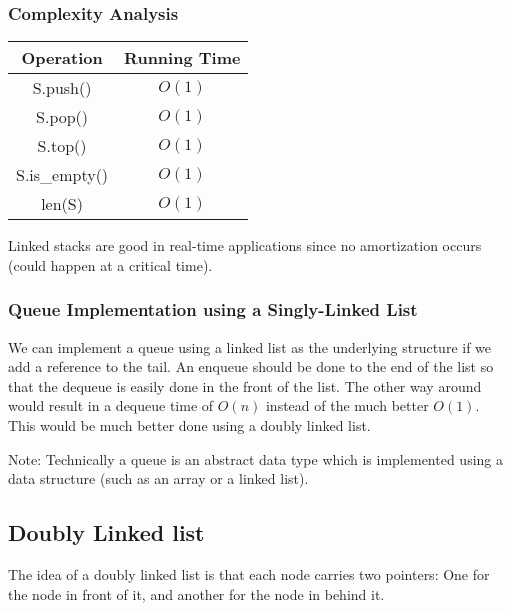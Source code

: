 \documentclass[]{article}
\begin{document}
\subsubsection{Complexity Analysis}\bigbreak

\begin{center}
	\begin{table}[h!]\centering
		\begin{tabular}{|c|c|}
			\hline
			Operation   & Running Time\\\hline
			S.push() & $O(1)$\\
			S.pop() & $O(1)$\\
			S.top() & $O(1)$\\
			S.is\_empty() & $O(1)$\\
			len(S) & $O(1)$\\\hline
		\end{tabular}
	\end{table}
\end{center}\bigbreak

Linked stacks are good in real-time applications since no amortization occurs (could happen at a critical time).


\subsubsection{Queue Implementation using a Singly-Linked List}\bigbreak

We can implement a queue using a linked list as the underlying structure if we add a reference to the tail. An enqueue should be done to the end of the list so that the dequeue is easily done in the front of the list. The other way around would result in a dequeue time of $O(n)$ instead of the much better $O(1)$.\\

This would be much better done using a doubly linked list.

Note: Technically a queue is an abstract data type which is implemented using a data structure (such as an array or a linked list).\\


\subsection{Doubly Linked list}\bigbreak

The idea of a doubly linked list is that each node carries two pointers: One for the node in front of it, and another for the node in behind it. \\
\end{document}
